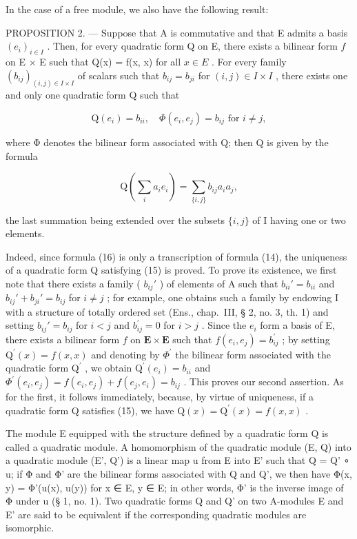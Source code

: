 In the case of a free module, we also have the following result:

PROPOSITION 2. --- Suppose that A is commutative and that E admits a basis \((e_i)_{i \in I}\) . Then, for every quadratic form Q on E, there exists a bilinear form \(f\) on E \(\times\) E such that Q(x) = f(x, x) for all \(x \in E\) . For every family \((b_{ij})_{(i,j) \in I \times I}\) of scalars such that \(b_{ij} = b_{ji}\) for \((i, j) \in I \times I\) , there exists one and only one quadratic form Q such that

\[
\mathrm{Q} (e _ {i}) = b _ {i i}, \quad \Phi (e _ {i}, e _ {j}) = b _ {i j} \text {   for   } i \neq j,\tag{15}
\]

where Φ denotes the bilinear form associated with Q; then Q is given by the formula

\[
\mathrm{Q} (\sum_ {i} a _ {i} e _ {i}) = \sum_ {\{i, j \}} b _ {i j} a _ {i} a _ {j},\tag{16}
\]

the last summation being extended over the subsets \(\{i, j\}\) of I having one or two elements.

Indeed, since formula (16) is only a transcription of formula (14), the uniqueness of a quadratic form Q satisfying (15) is proved. To prove its existence, we first note that there exists a family ( \(b_{ij}'\) ) of elements of A such that \(b_{ii}' = b_{ii}\) and \(b_{ij}' + b_{ji}' = b_{ij}\) for \(i \neq j\) ; for example, one obtains such a family by endowing I with a structure of totally ordered set (Ens., chap.~III, § 2, no. 3, th. 1) and setting \(b_{ij}' = b_{ij}\) for \(i<j\) and \(b_{ij}^{\prime}=0\) for \(i>j\) . Since the \(e_{i}\) form a basis of E, there exists a bilinear form \(f\) on \(\mathbf{E}\times\mathbf{E}\) such that \(f(e_{i},e_{j})=b_{ij}^{\prime}\) ; by setting \(\mathrm{Q}^{\prime}(x)=f(x,x)\) and denoting by \(\Phi^{\prime}\) the bilinear form associated with the quadratic form \(\mathrm{Q}^{\prime}\) , we obtain \(\mathrm{Q}^{\prime}(e_{i})=b_{ii}\) and \(\Phi^{\prime}(e_{i},e_{j})=f(e_{i},e_{j})+f(e_{j},e_{i})=b_{ij}\) . This proves our second assertion. As for the first, it follows immediately, because, by virtue of uniqueness, if a quadratic form Q satisfies (15), we have \(\mathrm{Q}(x)=\mathrm{Q}^{\prime}(x)=f(x,x)\) .

The module E equipped with the structure defined by a quadratic form Q is called a quadratic module. A homomorphism of the quadratic module (E, Q) into a quadratic module (E', Q') is a linear map u from E into E' such that Q = Q' ∘ u; if Φ and Φ' are the bilinear forms associated with Q and Q', we then have Φ(x, y) = Φ'(u(x), u(y)) for x ∈ E, y ∈ E; in other words, Φ' is the inverse image of Φ under u (§ 1, no. 1). Two quadratic forms Q and Q' on two A-modules E and E' are said to be equivalent if the corresponding quadratic modules are isomorphic.

